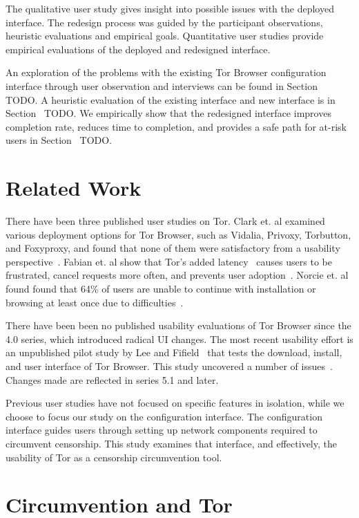 \documentclass[USenglish,oneside,twocolumn]{article}
\begin{document}
The qualitative user study gives insight into possible issues with
the deployed interface. 
The redesign process was guided by the participant observations, 
heuristic evaluations and empirical goals. 
Quantitative user studies provide empirical evaluations of the deployed
and redesigned interface. 

An exploration of the problems with the existing Tor Browser 
configuration interface through user observation and interviews can be 
found in Section~{\color{red} TODO}. A heuristic evaluation of the existing interface and new interface is in Section~{\color{red} TODO}. We empirically show 
that the redesigned interface improves completion rate, reduces time to completion, 
and provides a safe path for at-risk users in Section~{\color{red} TODO}. 

\section{Related Work} 
There have been three published user studies on Tor. Clark et. al examined various deployment
options for Tor Browser, such as Vidalia, Privoxy, Torbutton, and Foxyproxy, and found that none of them 
were satisfactory from a usability perspective~\cite{clark2007usability}. Fabian et. al show that Tor's added
latency~\cite{dingledine2009performance} causes users
to be frustrated, cancel requests more often, and prevents user adoption~\cite{fabian2010privately}. 
Norcie et. al found found that 
64\% of users are unable to continue with installation or browsing at least once due to difficulties~\cite{norcie2012eliminating}. 

There have been been no published usability evaluations of
Tor Browser since the 4.0 series, which introduced radical UI changes. 
The most recent usability effort is an unpublished pilot study  by Lee and Fifield~\cite {uxsprint} 
that tests the download, install, and  user interface of Tor Browser.  This study uncovered a number of issues~\cite{uxsprint2015-tickets}. Changes made are reflected in series 5.1 and later. 

Previous user studies have not focused on specific features in isolation, while we choose to focus our study on 
the configuration interface. The configuration interface guides users through setting up network components required to circumvent censorship. 
This study examines that interface, and effectively, the usability of Tor as a censorship circumvention tool. 

\section{Circumvention and Tor}
\end{document}
